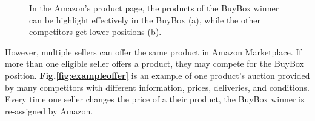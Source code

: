 {\begin{figure}[!h]
	\begin{center}
	\end{center}
	\caption{\label{fig:buyboxexample}In the Amazon's product page, the products of the BuyBox 
		winner can be highlight effectively in the BuyBox (a), while the other competitors get lower 
		positions (b).}
\end{figure}


However, multiple sellers can offer the same product in Amazon Marketplace. If more than one eligible seller offers a product, they may compete for the BuyBox position. \textbf{Fig.\ref{fig:exampleoffer}} is an example of one product's auction provided by many competitors with different information, prices, deliveries, and conditions. Every time one seller changes the price of a their product, the BuyBox winner is re-assigned by Amazon. 

}
